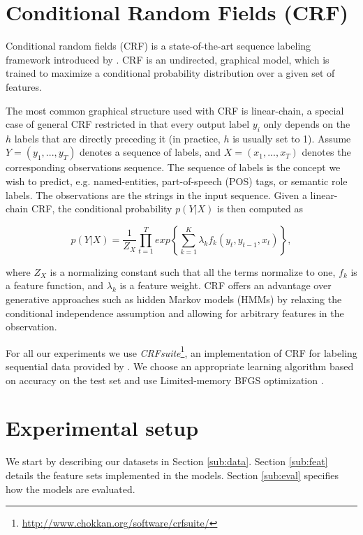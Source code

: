 \documentclass[a4paper,twoside,12pt]{article}
\begin{document}
\section{Conditional Random Fields (CRF)}
\label{sec:crf}

Conditional random fields (CRF) is a state-of-the-art sequence labeling framework introduced by \cite{lafferty}. CRF is an undirected, graphical model, which is trained to maximize a conditional probability distribution over a given set of features.

The most common graphical structure used with CRF is linear-chain, a special case of general CRF restricted in that every output label $y_{i}$ only depends on the $h$ labels that are directly preceding it (in practice, $h$ is usually set to 1). Assume $Y = (y_1,...,y_T)$ denotes a sequence of labels, and $X = (x_1,...,x_T)$ denotes the corresponding observations sequence. The sequence of labels is the concept we wish to predict, e.g. named-entities, part-of-speech (POS) tags, or semantic role labels. The observations are the strings in the input sequence. Given a linear-chain CRF, the conditional probability $p(Y|X)$ is then computed as

\begin{equation*}
  p(Y| X) = \frac{1}{Z_X} \prod_{t=1}^{T} exp \left\{ \sum_{k=1}^{K} \lambda_{k} f_k (y_t,y_{t-1},x_t) \right\},
\end{equation*}

where  $Z_X$ is a normalizing constant such that all the terms normalize to one, $f_{k}$ is a feature function, and $\lambda_{k}$ is a feature weight. CRF offers an advantage over generative approaches such as hidden Markov models (HMMs) by relaxing the conditional independence assumption and allowing for arbitrary features in the observation.
 
For all our experiments we use \textit{CRFsuite}\footnote{\url{http://www.chokkan.org/software/crfsuite/}}, an implementation of CRF for labeling sequential data provided by \cite{CRFsuite}. We choose an appropriate learning algorithm based on accuracy on the test set and use Limited-memory BFGS optimization \citep{nocedal}. 

\section{Experimental setup}
\label{sec:setup}

We start by describing our datasets in Section \ref{sub:data}. Section \ref{sub:feat} details the feature sets implemented in the models. Section \ref{sub:eval} specifies how the models are evaluated.
\end{document}
